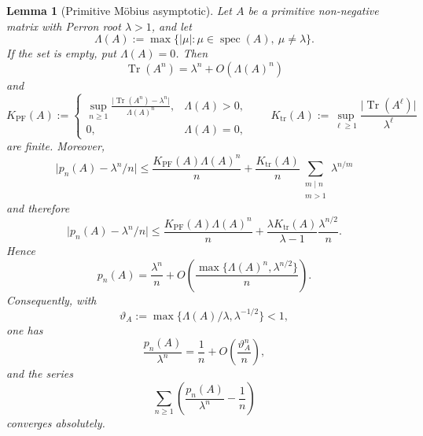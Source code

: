 \documentclass[11pt,a4paper]{amsart}
\theoremstyle{plain}
\newtheorem{lemma}[theorem]{Lemma}
\theoremstyle{definition}
\theoremstyle{remark}
\DeclareMathOperator{\Tr}{Tr}
\DeclareMathOperator{\spec}{spec}
\newcommand{\abs}[1]{\lvert #1 \rvert}
\begin{document}
\begin{lemma}[Primitive M\"obius asymptotic]
  \label{lem:primitive-orbit-asymptotic}
  Let \(A\) be a primitive non-negative matrix with Perron root
  \(\lambda>1\), and let
  \[
    \Lambda(A):=\max\{|\mu|:\mu\in\spec(A),\ \mu\neq\lambda\}.
  \]
  If the set is empty, put \(\Lambda(A)=0\).
  Then
  \[
    \Tr(A^n)=\lambda^n+O(\Lambda(A)^n)
  \]
  and
  \[
    K_{\mathrm{PF}}(A)
    :=
    \begin{cases}
      \displaystyle
      \sup_{n\ge 1}
        \frac{\abs{\Tr(A^n)-\lambda^n}}{\Lambda(A)^n},
      & \Lambda(A)>0, \\[2ex]
      0,
      & \Lambda(A)=0,
    \end{cases}
    \qquad
    K_{\mathrm{tr}}(A)
    :=
    \sup_{\ell\ge 1}\frac{\abs{\Tr(A^\ell)}}{\lambda^\ell}
  \]
  are finite. Moreover,
  \[
    \abs{p_n(A)-\lambda^n/n}
    \le
    \frac{K_{\mathrm{PF}}(A)\Lambda(A)^n}{n}
    +\frac{K_{\mathrm{tr}}(A)}{n}
      \sum_{\substack{m\mid n\\ m>1}}\lambda^{n/m}
  \]
  and therefore
  \[
    \abs{p_n(A)-\lambda^n/n}
    \le
    \frac{K_{\mathrm{PF}}(A)\Lambda(A)^n}{n}
    +\frac{\lambda K_{\mathrm{tr}}(A)}{\lambda-1}
      \frac{\lambda^{n/2}}{n}.
  \]
  Hence
  \[
    p_n(A)
    =
    \frac{\lambda^n}{n}
    +O\!\left(
      \frac{\max\{\Lambda(A)^n,\lambda^{n/2}\}}{n}
    \right).
  \]
  Consequently, with
  \[
    \vartheta_A:=\max\{\Lambda(A)/\lambda,\lambda^{-1/2}\}<1,
  \]
  one has
  \[
    \frac{p_n(A)}{\lambda^n}
    =
    \frac{1}{n}+O\!\left(\frac{\vartheta_A^n}{n}\right),
  \]
  and the series
  \[
    \sum_{n\ge 1}
      \left(\frac{p_n(A)}{\lambda^n}-\frac{1}{n}\right)
  \]
  converges absolutely.
\end{lemma}
\end{document}
